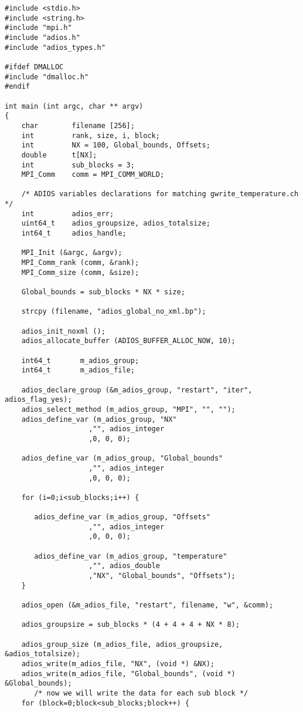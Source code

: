 \begin{lstlisting}[alsolanguage=C]
#include <stdio.h>
#include <string.h>
#include "mpi.h"
#include "adios.h"
#include "adios_types.h"

#ifdef DMALLOC
#include "dmalloc.h"
#endif

int main (int argc, char ** argv)
{
    char        filename [256];
    int         rank, size, i, block;
    int         NX = 100, Global_bounds, Offsets;
    double      t[NX];
    int         sub_blocks = 3;
    MPI_Comm    comm = MPI_COMM_WORLD;

    /* ADIOS variables declarations for matching gwrite_temperature.ch */
    int         adios_err;
    uint64_t    adios_groupsize, adios_totalsize;
    int64_t     adios_handle;

    MPI_Init (&argc, &argv);
    MPI_Comm_rank (comm, &rank);
    MPI_Comm_size (comm, &size);

    Global_bounds = sub_blocks * NX * size;

    strcpy (filename, "adios_global_no_xml.bp");

    adios_init_noxml ();
    adios_allocate_buffer (ADIOS_BUFFER_ALLOC_NOW, 10);

    int64_t       m_adios_group;
    int64_t       m_adios_file;

    adios_declare_group (&m_adios_group, "restart", "iter", adios_flag_yes);
    adios_select_method (m_adios_group, "MPI", "", "");
    adios_define_var (m_adios_group, "NX"
                    ,"", adios_integer
                    ,0, 0, 0);

    adios_define_var (m_adios_group, "Global_bounds"
                    ,"", adios_integer
                    ,0, 0, 0);

    for (i=0;i<sub_blocks;i++) {

       adios_define_var (m_adios_group, "Offsets"
                    ,"", adios_integer
                    ,0, 0, 0);

       adios_define_var (m_adios_group, "temperature"
                    ,"", adios_double
                    ,"NX", "Global_bounds", "Offsets");
    }

    adios_open (&m_adios_file, "restart", filename, "w", &comm);

    adios_groupsize = sub_blocks * (4 + 4 + 4 + NX * 8);

    adios_group_size (m_adios_file, adios_groupsize, &adios_totalsize);
    adios_write(m_adios_file, "NX", (void *) &NX);
    adios_write(m_adios_file, "Global_bounds", (void *) &Global_bounds);
       /* now we will write the data for each sub block */
    for (block=0;block<sub_blocks;block++) {


\end{lstlisting}
